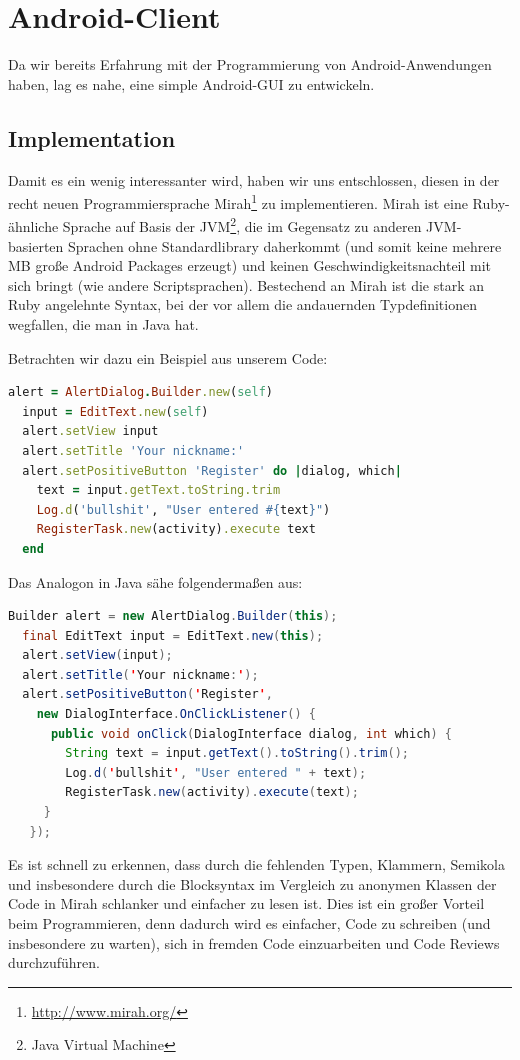 \documentclass[12pt, a4paper]{scrartcl}
\begin{document}
\section{Android-Client}

Da wir bereits Erfahrung mit der Programmierung von Android-Anwendungen haben,
lag es nahe, eine simple Android-GUI zu entwickeln.

\subsection{Implementation}

Damit es ein wenig interessanter wird, haben wir uns entschlossen, diesen in
der recht neuen Programmiersprache Mirah\footnote{\url{http://www.mirah.org/}}
zu implementieren. Mirah ist eine Ruby-ähnliche Sprache auf Basis der
JVM\footnote{Java Virtual Machine}, die im Gegensatz zu anderen JVM-basierten
Sprachen ohne Standardlibrary daherkommt (und somit keine mehrere MB große
Android Packages erzeugt) und keinen Geschwindigkeitsnachteil mit sich bringt
(wie andere Scriptsprachen). Bestechend an Mirah ist die stark an Ruby
angelehnte Syntax, bei der vor allem die andauernden Typdefinitionen wegfallen,
die man in Java hat.
\np

Betrachten wir dazu ein Beispiel aus unserem Code:
\begin{lstlisting}[language=Ruby]
  alert = AlertDialog.Builder.new(self)
  input = EditText.new(self)
  alert.setView input
  alert.setTitle 'Your nickname:'
  alert.setPositiveButton 'Register' do |dialog, which|
    text = input.getText.toString.trim
    Log.d('bullshit', "User entered #{text}")
    RegisterTask.new(activity).execute text
  end
\end{lstlisting}

Das Analogon in Java sähe folgendermaßen aus:
\begin{lstlisting}[language=Java]
  Builder alert = new AlertDialog.Builder(this);
  final EditText input = EditText.new(this);
  alert.setView(input);
  alert.setTitle('Your nickname:');
  alert.setPositiveButton('Register',
    new DialogInterface.OnClickListener() {
      public void onClick(DialogInterface dialog, int which) {
        String text = input.getText().toString().trim();
        Log.d('bullshit', "User entered " + text);
        RegisterTask.new(activity).execute(text);
     }
   });
\end{lstlisting}

Es ist schnell zu erkennen, dass durch die fehlenden Typen, Klammern, Semikola
und insbesondere durch die Blocksyntax im Vergleich zu anonymen Klassen der
Code in Mirah schlanker und einfacher zu lesen ist. Dies ist ein großer Vorteil
beim Programmieren, denn dadurch wird es einfacher, Code zu schreiben (und
insbesondere zu warten), sich in fremden Code einzuarbeiten und Code Reviews
durchzuführen.
\end{document}
